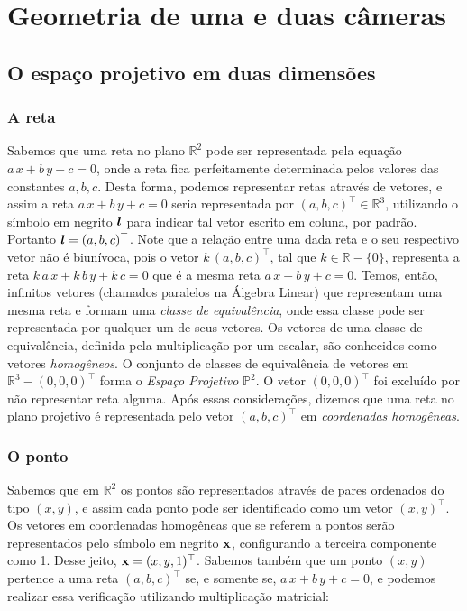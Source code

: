 \section{Geometria de uma e duas câmeras}\label{sec.geo-1-2-cam}

\subsection{O espaço projetivo em duas dimensões}\label{sec.espaco-P2}


\subsubsection{A reta}\label{sec.reta}


Sabemos que uma reta no plano $\mathbb{R}^{2}$ pode ser representada pela equação $a\,x+b\,y+c=0$, onde a reta fica perfeitamente determinada pelos valores das constantes $a,b,c$. Desta forma, podemos representar retas através de vetores, e assim a reta $a\,x+b\,y+c=0$ seria representada por $(a,b,c)^\top \in \mathbb{R}^{3}$, utilizando o símbolo em negrito $\boldsymbol{l}$ para indicar tal vetor escrito em coluna, por padrão. Portanto $\boldsymbol{l} = (a,b,c)^\top$. Note que a relação entre uma dada reta e o seu respectivo vetor não é biunívoca, pois o vetor $k\,(a,b,c)^\top$, tal que $k \in \mathbb{R}-\{0\}$, representa a reta $k\,a\,x+k\,b\,y+k\,c=0$ que é a mesma reta $a\,x+b\,y+c=0$. Temos, então, infinitos vetores (chamados paralelos na Álgebra Linear) que representam uma mesma reta e formam uma {\it classe de equivalência}, onde essa classe pode ser representada por qualquer um de seus vetores. Os vetores de uma classe de equivalência, definida pela multiplicação por um escalar, são conhecidos como vetores {\it homogêneos}. O conjunto de classes de equivalência de vetores em $\mathbb{R}^{3} - (0,0,0)^\top$ forma o {\it Espaço Projetivo} $\mathbb{P}^{2}$. O vetor $(0,0,0)^\top$ foi excluído por não representar reta alguma. Após essas considerações, dizemos que uma reta no plano projetivo é representada pelo vetor $(a,b,c)^\top$ em {\it coordenadas homogêneas}.\\

\subsubsection{O ponto}\label{sec.ponto}


Sabemos que em $\mathbb{R}^{2}$ os pontos são representados através de pares ordenados do tipo $(x,y)$, e assim cada ponto pode ser identificado como um vetor $(x,y)^\top$. Os vetores em coordenadas homogêneas que se referem a pontos serão representados pelo símbolo em negrito $\mathbf{x}$, configurando a terceira componente como 1. Desse jeito, $\mathbf{x}=(x,y,1)^\top$. Sabemos também que um ponto $(x,y)$ pertence a uma reta $(a,b,c)^\top$ se, e somente se, $a\,x+b\,y+c=0$, e podemos realizar essa verificação utilizando multiplicação matricial:

